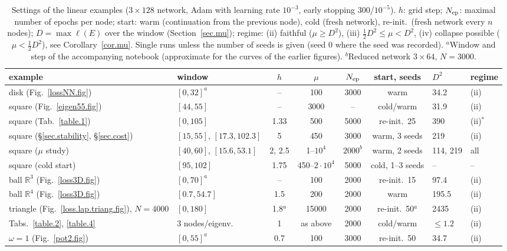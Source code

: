 \documentclass[10pt]{amsart}
\theoremstyle{definition}
\theoremstyle{remark}
\theoremstyle{plain}
\newcommand{\R}{\mathbb{R}}
\begin{document}
\begin{table}[tbp]
\centering\scriptsize
\color{blue}
\caption{Settings of the linear examples ($3\times128$ network, Adam with learning rate $10^{-3}$,
early stopping 300/$10^{-5}$). $h$: grid step; $N_{\rm ep}$: maximal number of epochs per node;
start: warm (continuation from the previous node), cold (fresh network), re-init.\ (fresh network
every $n$ nodes); $D=\max\ell(E)$ over the window (Section~\ref{sec.mu}); regime: (ii) faithful
($\mu\ge D^2$), (iii) $\frac12D^2\le\mu<D^2$, (iv) collapse possible ($\mu<\frac12D^2$), see
Corollary~\ref{cor.mu}. Single runs unless the number of seeds is given (seed 0 where the seed was
recorded). $^a$Window and step of the accompanying notebook (approximate for the curves of the
earlier figures). $^b$Reduced network $3\times64$, $N=3000$.}
\label{table.settings}
\begin{tabular}{@{}llccccll@{}}
\toprule
example & window & $h$ & $\mu$ & $N_{\rm ep}$ & start, seeds & $D^2$ & regime\\
\midrule
disk (Fig.~\ref{lossNN.fig}) & $[0,32]^a$ & -- & 100 & 3000 & warm & 34.2 & (ii)\\
square (Fig.~\ref{eigen55.fig}) & $[44,55]$ & -- & 3000 & -- & cold/warm & 31.9 & (ii)\\
square (Tab.~\ref{table.1}) & $[0,105]$ & 1.33 & 500 & 5000 & re-init.\ 25 & 390 & (ii)$^\ast$\\
square (\S\ref{sec.stability}, \S\ref{sec.cost}) & $[15,55]$, $[17.3,102.3]$ & 5 & 450 & 3000 & warm, 3 seeds & 219 & (ii)\\
square ($\mu$ study) & $[40,60]$, $[15.6,53.1]$ & 2, 2.5 & 1--$10^4$ & $2000^b$ & warm, 2 seeds & 114, 219 & all\\
square (cold start) & $[95,102]$ & 1.75 & 450--$2\cdot10^4$ & 5000 & cold, 1--3 seeds & -- & --\\
ball $\R^3$ (Fig.~\ref{loss3D.fig}) & $[0,70]^a$ & -- & 100 & 2000 & re-init.\ 15 & 97.4 & (ii)\\
ball $\R^4$ (Fig.~\ref{loss3D.fig}) & $[0.7,54.7]$ & 1.5 & 200 & 2000 & warm & 195.5 & (ii)\\
triangle (Fig.~\ref{loss.lap.triang.fig}), $N\!=\!4000$ & $[0,180]$ & 1.8$^a$ & 15000 & 2000 & re-init.\ 50$^a$ & 2435 & (ii)\\
Tabs.~\ref{table.2}, \ref{table.4} & 3 nodes/eigenv. & 1 & as above & 2000 & cold/warm & $\le1.2$ & (ii)\\
$\omega=1$ (Fig.~\ref{pot2.fig}) & $[0,55]^a$ & 0.7 & 100 & 3000 & re-init.\ 50 & 34.7 & (ii)\\

\end{tabular}
\end{table}
\end{document}
